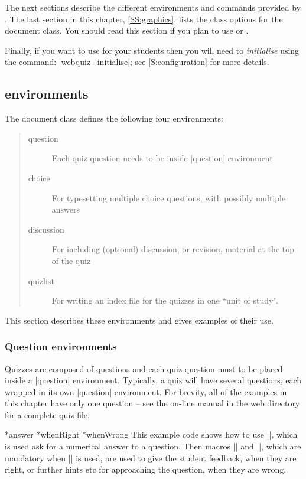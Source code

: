 \documentclass[svgnames]{article}
\makeatletter
\newcommand\macroIndex[1]{%
  \lowercase{\def\temp{#1}}%
  \expandafter\index\expandafter{\temp@\textbackslash#1}%
}
\newcommand\gobbleone[1]{}%
\newcommand\SeeIndex[2]{\index{#1!zzzz@\protect\gobbleone|See{#2}}}
\makeatother
\begin{document}
  The next sections describe the different environments and commands
  provided by \WebQuiz. The last section in this chapter,
  \autoref{SS:graphics}, lists the class options for the \WebQuiz
  document class. You should read this section if you plan to use
   or .

  Finally, if you want to use \WebQuiz for your students then you will
  need to \textit{initialise} \WebQuiz using the command:
  \BashCode|webquiz --initialise|; see \autoref{S:configuration} for more
  details.

\subsection{\WebQuiz environments}

The \WebQuiz document class defines the following four environments:
\begin{quote}
  \begin{description}
    \item[question] Each quiz question needs to be inside
    \LatexCode|question| environment
    \item[choice] For typesetting multiple choice questions, with
    possibly multiple answers
    \item[discussion] For including (optional) discussion, or revision,
    material at the top of the quiz
    \item[quizlist] For writing an index file for the quizzes in
    one ``unit of study''.
  \end{description}
\end{quote}
This section describes these environments and gives examples
of their use.

\subsubsection{Question environments}

Quizzes are composed of questions and each quiz question must to be
placed inside a \LatexCode|question| environment. Typically, a quiz will have
several questions, each wrapped in its own \LatexCode|question| environment.
For brevity, all of the examples in this chapter have only one question
-- see the on-line manual in the \WebQuiz web directory for a complete quiz file.

  \macroIndex{answer}*{answer}
  *{whenRight}
  *{whenWrong}
  \SeeIndex{numeric answer}{\textbackslash answer}
  This example code shows how to use \LatexCode|\answer|, which is used
  ask for a numerical answer to a question. Then macros
  \LatexCode|\whenRight| and \LatexCode|\whenWrong|, which are mandatory when
  \LatexCode|\answer| is used, are used to give the student feedback, when
  they are right, or further hints etc for approaching the question,
  when they are wrong.
\end{document}
